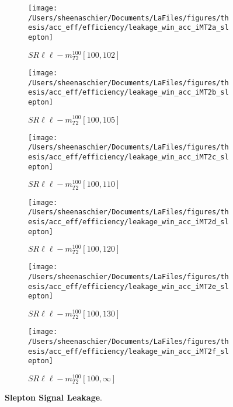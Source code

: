 \begin{figure}
        \centering
    \begin{subfigure}[b]{0.44\textwidth}
        \texttt{[image: /Users/sheenaschier/Documents/LaFiles/figures/thesis/acc\_eff/efficiency/leakage\_win\_acc\_iMT2a\_slepton]}
    \caption{$SR\ell\ell-m^{100}_{T2}[100,102]$}
    \end{subfigure}
    \begin{subfigure}[b]{0.44\textwidth}
        \texttt{[image: /Users/sheenaschier/Documents/LaFiles/figures/thesis/acc\_eff/efficiency/leakage\_win\_acc\_iMT2b\_slepton]}
    \caption{$SR\ell\ell-m^{100}_{T2}[100,105]$}
    \end{subfigure}
    \begin{subfigure}[b]{0.44\textwidth}
        \texttt{[image: /Users/sheenaschier/Documents/LaFiles/figures/thesis/acc\_eff/efficiency/leakage\_win\_acc\_iMT2c\_slepton]}
    \caption{$SR\ell\ell-m^{100}_{T2}[100,110]$}
    \end{subfigure}
    \begin{subfigure}[b]{0.44\textwidth}
        \texttt{[image: /Users/sheenaschier/Documents/LaFiles/figures/thesis/acc\_eff/efficiency/leakage\_win\_acc\_iMT2d\_slepton]}
    \caption{$SR\ell\ell-m^{100}_{T2}[100,120]$}
    \end{subfigure}
    \begin{subfigure}[b]{0.44\textwidth}
        \texttt{[image: /Users/sheenaschier/Documents/LaFiles/figures/thesis/acc\_eff/efficiency/leakage\_win\_acc\_iMT2e\_slepton]}
    \caption{$SR\ell\ell-m^{100}_{T2}[100,130]$}
    \end{subfigure}
    \begin{subfigure}[b]{0.44\textwidth}
        \texttt{[image: /Users/sheenaschier/Documents/LaFiles/figures/thesis/acc\_eff/efficiency/leakage\_win\_acc\_iMT2f\_slepton]}
    \caption{$SR\ell\ell-m^{100}_{T2}[100,\infty]$}
    \end{subfigure}
    \caption{\label{fig:slepton_leakage}\textbf{Slepton Signal Leakage}.}
\end{figure}

